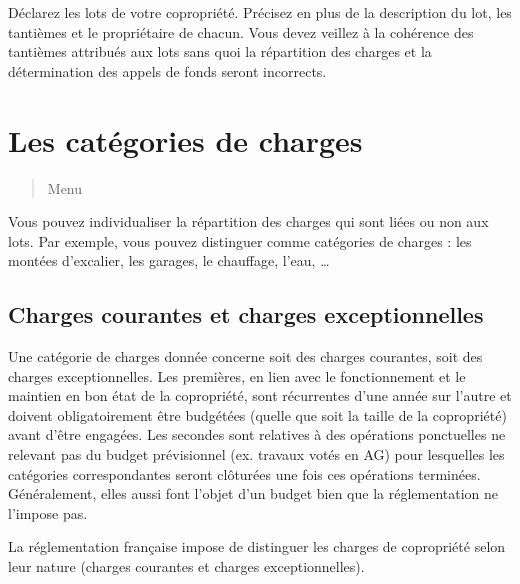 \documentclass[a4paper,10pt,oneside,french]{sphinxmanual}
\begin{document}
Déclarez les lots de votre copropriété.
Précisez en plus de la description du lot, les tantièmes et le propriétaire de chacun.
Vous devez veillez à la cohérence des tantièmes attribués aux lots sans quoi la répartition des charges et la détermination des appels de fonds seront incorrects.
\begin{quote}

\noindent{}
\end{quote}


\section{Les catégories de charges}
\label{\detokenize{condominium/classloads:les-categories-de-charges}}\label{\detokenize{condominium/classloads::doc}}\begin{quote}

Menu 
\end{quote}

Vous pouvez individualiser la répartition des charges qui sont liées ou non aux lots.
Par exemple, vous pouvez distinguer comme catégories de charges : les montées d’excalier, les garages, le chauffage, l’eau, …


\subsection{Charges courantes et charges exceptionnelles}
\label{\detokenize{condominium/classloads:charges-courantes-et-charges-exceptionnelles}}
Une catégorie de charges donnée concerne soit des charges courantes, soit des charges exceptionnelles.
Les premières, en lien avec le fonctionnement et le maintien en bon état de la copropriété, sont récurrentes d’une année sur l’autre et doivent obligatoirement être budgétées (quelle que soit la taille de la copropriété) avant d’être engagées. Les secondes sont relatives à des opérations ponctuelles ne relevant pas du budget prévisionnel (ex. travaux votés en AG) pour lesquelles les catégories correspondantes seront clôturées une fois ces opérations terminées. Généralement, elles aussi font l’objet d’un budget bien que la réglementation ne l’impose pas.

La réglementation française impose de distinguer les charges de copropriété selon leur nature (charges courantes et charges exceptionnelles).
\end{document}
